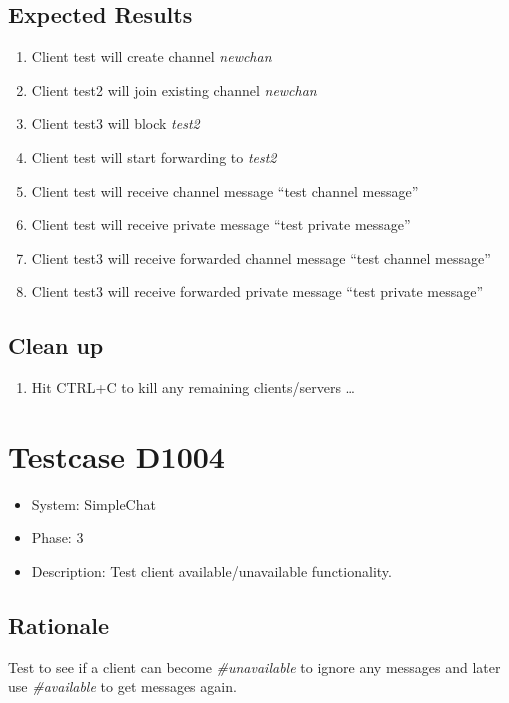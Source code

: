 \documentclass[12pt]{article}
\begin{document}
\subsection*{Expected Results}
\begin{enumerate}
\item Client test will create channel \emph{newchan}
\item Client test2 will join existing channel \emph{newchan}
\item Client test3 will block \emph{test2}
\item Client test will start forwarding to \emph{test2}
\item Client test will receive channel message ``test channel message''
\item Client test will receive private message ``test private message''
\item Client test3 will receive forwarded channel message ``test channel message''
\item Client test3 will receive forwarded private message ``test private message''
\end{enumerate}

\subsection*{Clean up}
\begin{enumerate}
\item Hit CTRL+C to kill any remaining clients/servers \dots
\end{enumerate}

\section{Testcase D1004}
\begin{itemize}
\item System: SimpleChat
\item Phase: 3
\item Description: Test client available/unavailable functionality.
\end{itemize}

\subsection*{Rationale}
Test to see if a client can become \emph{\#unavailable} to ignore any messages
and later use \emph{\#available} to get messages again.
\end{document}
